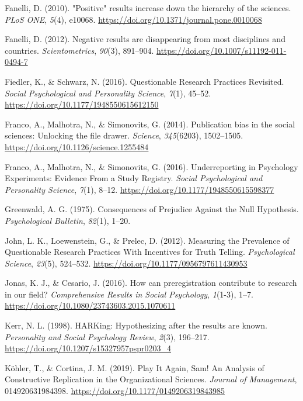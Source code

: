 \documentclass[british,,man,floatsintext]{apa6}
\begin{document}
\leavevmode\hypertarget{ref-Fanelli2010}{}%
Fanelli, D. (2010). "Positive" results increase down the hierarchy of the sciences. \emph{PLoS ONE}, \emph{5}(4), e10068. \url{https://doi.org/10.1371/journal.pone.0010068}

\leavevmode\hypertarget{ref-Fanelli2012}{}%
Fanelli, D. (2012). Negative results are disappearing from most disciplines and countries. \emph{Scientometrics}, \emph{90}(3), 891--904. \url{https://doi.org/10.1007/s11192-011-0494-7}

\leavevmode\hypertarget{ref-Fiedler2016}{}%
Fiedler, K., \& Schwarz, N. (2016). Questionable Research Practices Revisited. \emph{Social Psychological and Personality Science}, \emph{7}(1), 45--52. \url{https://doi.org/10.1177/1948550615612150}

\leavevmode\hypertarget{ref-Franco2014}{}%
Franco, A., Malhotra, N., \& Simonovits, G. (2014). Publication bias in the social sciences: Unlocking the file drawer. \emph{Science}, \emph{345}(6203), 1502--1505. \url{https://doi.org/10.1126/science.1255484}

\leavevmode\hypertarget{ref-Franco2016}{}%
Franco, A., Malhotra, N., \& Simonovits, G. (2016). Underreporting in Psychology Experiments: Evidence From a Study Registry. \emph{Social Psychological and Personality Science}, \emph{7}(1), 8--12. \url{https://doi.org/10.1177/1948550615598377}

\leavevmode\hypertarget{ref-Greenwald1975}{}%
Greenwald, A. G. (1975). Consequences of Prejudice Against the Null Hypothesis. \emph{Psychological Bulletin}, \emph{82}(1), 1--20.

\leavevmode\hypertarget{ref-John2012}{}%
John, L. K., Loewenstein, G., \& Prelec, D. (2012). Measuring the Prevalence of Questionable Research Practices With Incentives for Truth Telling. \emph{Psychological Science}, \emph{23}(5), 524--532. \url{https://doi.org/10.1177/0956797611430953}

\leavevmode\hypertarget{ref-Jonas2016}{}%
Jonas, K. J., \& Cesario, J. (2016). How can preregistration contribute to research in our field? \emph{Comprehensive Results in Social Psychology}, \emph{1}(1-3), 1--7. \url{https://doi.org/10.1080/23743603.2015.1070611}

\leavevmode\hypertarget{ref-Kerr1998}{}%
Kerr, N. L. (1998). HARKing: Hypothesizing after the results are known. \emph{Personality and Social Psychology Review}, \emph{2}(3), 196--217. \url{https://doi.org/10.1207/s15327957pspr0203_4}

\leavevmode\hypertarget{ref-Kohler2019}{}%
Köhler, T., \& Cortina, J. M. (2019). Play It Again, Sam! An Analysis of Constructive Replication in the Organizational Sciences. \emph{Journal of Management}, 014920631984398. \url{https://doi.org/10.1177/0149206319843985}
\end{document}
